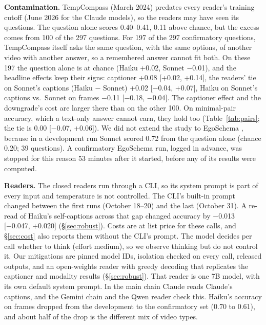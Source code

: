 \documentclass[11pt]{article}
\begin{document}
\textbf{Contamination.} TempCompass (March 2024) predates every reader's training cutoff (June 2026 for the Claude models), so the readers may have seen its questions. The question alone scores 0.40--0.41, 0.11 above chance, but the excess comes from 100 of the 297 questions. For 197 of the 297 confirmatory questions, TempCompass itself asks the same question, with the same options, of another video with another answer, so a remembered answer cannot fit both. On these 197 the question alone is at chance (Haiku +0.02, Sonnet $-$0.01), and the headline effects keep their signs: captioner +0.08 [+0.02, +0.14], the readers' tie on Sonnet's captions (Haiku − Sonnet) +0.02 [$-$0.04, +0.07], Haiku on Sonnet's captions vs.\ Sonnet on frames $-$0.11 [$-$0.18, $-$0.04]. The captioner effect and the downgrade's cost are larger there than on the other 100. On minimal-pair accuracy, which a text-only answer cannot earn, they hold too (Table~\ref{tab:pairs}; the tie is 0.00 [$-$0.07, +0.06]). We did not extend the study to EgoSchema \citep{egoschema}, because in a development run Sonnet scored 0.72 from the question alone (chance 0.20; 39 questions). A confirmatory EgoSchema run, logged in advance, was stopped for this reason 53 minutes after it started, before any of its results were computed.

\textbf{Readers.} The closed readers run through a CLI, so its system prompt is part of every input and temperature is not controlled. The CLI's built-in prompt changed between the first runs (October 18--20) and the last (October 31). A re-read of Haiku's self-captions across that gap changed accuracy by −0.013 [−0.047, +0.020] (\S\ref{sec:robust}). Costs are at list price for these calls, and \S\ref{sec:cost} also reports them without the CLI's prompt. The model decides per call whether to think (effort medium), so we observe thinking but do not control it. Our mitigations are pinned model IDs, isolation checked on every call, released outputs, and an open-weights reader with greedy decoding that replicates the captioner and modality results (\S\ref{sec:robust}). That reader is one 7B model, with its own default system prompt. In the main chain Claude reads Claude's captions, and the Gemini chain and the Qwen reader check this. Haiku's accuracy on frames dropped from the development to the confirmatory set (0.70 to 0.61), and about half of the drop is the different mix of video types.
\end{document}
